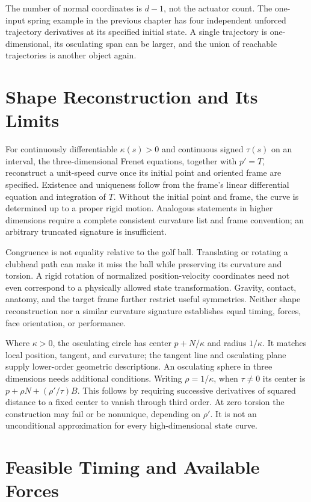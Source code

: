 \documentclass[12pt, openany]{book}
\theoremstyle{plain}
\begin{document}
The number of normal coordinates is $d-1$, not the actuator count. The
one-input spring example in the previous chapter has four independent
unforced trajectory derivatives at its specified initial state. A single
trajectory is one-dimensional, its osculating span can be larger, and the
union of reachable trajectories is another object again.

\section{Shape Reconstruction and Its Limits}

For continuously differentiable $\kappa(s)>0$ and continuous signed
$\tau(s)$ on an interval,
the three-dimensional Frenet equations, together with $p'=T$, reconstruct a
unit-speed curve once its initial point and oriented frame are specified.
Existence and uniqueness follow from the frame's linear differential
equation and integration of $T$. Without the initial point and frame, the
curve is determined up to a proper rigid motion. Analogous statements in
higher dimensions require a complete consistent curvature list and frame
convention; an arbitrary truncated signature is insufficient.

Congruence is not equality relative to the golf ball. Translating or rotating
a clubhead path can make it miss the ball while preserving its curvature and
torsion. A rigid rotation of normalized position-velocity coordinates need
not even correspond to a physically allowed state transformation. Gravity,
contact, anatomy, and the target frame further restrict useful symmetries.
Neither shape reconstruction nor a similar curvature signature establishes
equal timing, forces, face orientation, or performance.

Where $\kappa>0$, the osculating circle has center $p+N/\kappa$ and radius
$1/\kappa$. It matches local position, tangent, and curvature; the tangent
line and osculating plane supply lower-order geometric descriptions. An
osculating sphere in three dimensions needs additional conditions. Writing
$\rho=1/\kappa$, when $\tau\ne0$ its center is
$p+\rho N+(\rho'/\tau)B$. This follows by requiring successive derivatives
of squared distance to a fixed center to vanish through third order. At
zero torsion the construction may fail or be nonunique, depending on
$\rho'$. It is not an unconditional approximation for every high-dimensional
state curve.

\section{Feasible Timing and Available Forces}
\end{document}
